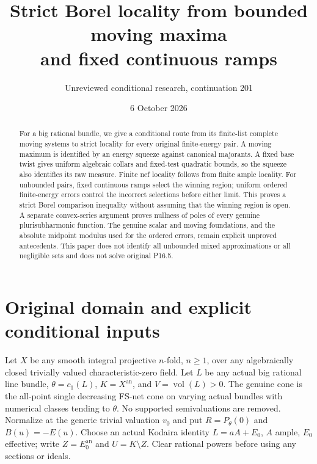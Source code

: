 \documentclass[11pt]{article}
\title{Strict Borel locality from bounded moving maxima\protect\\
and fixed continuous ramps}
\author{Unreviewed conditional research, continuation 201}
\date{6 October 2026}
\newcommand{\vol}{\operatorname{vol}}
\begin{document}
\maketitle
\begin{abstract}
For a big rational bundle, we give a conditional route from its finite-list
complete moving systems to strict locality for every original finite-energy
pair. A moving maximum is identified by an energy squeeze against canonical
majorants. A fixed base twist gives uniform algebraic collars and fixed-test
quadratic bounds, so the squeeze also identifies its raw measure.
Finite nef locality follows from finite ample locality. For unbounded pairs,
fixed continuous ramps select the winning region; uniform ordered
finite-energy errors control the incorrect selections before either limit.
This proves a strict Borel comparison inequality without assuming that the
winning region is open. A separate convex-series argument proves nullness
of poles of every genuine plurisubharmonic function. The genuine scalar and
moving foundations, and the absolute midpoint modulus used for the ordered
errors, remain explicit unproved antecedents. This paper does not identify
all unbounded mixed approximations or all negligible sets and does not
solve original P16.5.
\end{abstract}

\section{Original domain and explicit conditional inputs}
Let $X$ be any smooth integral projective $n$-fold, $n\geq1$, over any
algebraically closed trivially valued characteristic-zero field.
Let $L$ be any actual big rational line bundle, $\theta=c_1(L)$,
$K=X^{\mathrm{an}}$, and $V=\vol(L)>0$.
The genuine cone is the all-point single decreasing FS-net cone on
varying actual bundles with numerical classes tending to $\theta$.
No supported semivaluations are removed. Normalize at the generic trivial
valuation $v_0$ and put $R=P_\theta(0)$ and $B(u)=-E(u)$.
Choose an actual Kodaira identity $L=aA+E_0$, $A$ ample, $E_0$ effective;
write $Z=E_0^{\mathrm{an}}$ and $U=K\setminus Z$.
Clear rational powers before using any sections or ideals.
\end{document}
